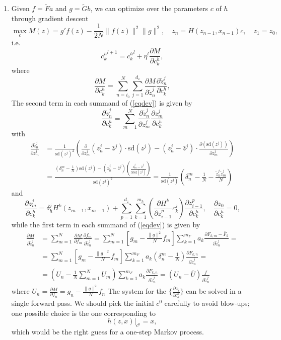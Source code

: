 \documentclass[a4paper,11pt]{article}
\theoremstyle{definition}
\begin{document}
\begin{enumerate}
\item Given $f=\tilde{F}a$ and $g=\tilde{G}b$, we can optimize over the parameters $c$ of $h$ through gradient descent
%
$$ \max_{c} M(z) =  g' f(z)  - \frac{1}{2 N} \|f(z)\|^2 \|g\|^2 , \quad  z_n = H\left(z_{n-1}, x_{n-1} \right) c, \quad  z_1 = z_0, $$
%
i.e.
%
$$ {c_{k}^h}^{l+1} = {c_{k}^h}^l + \eta^l \frac{\partial M}{\partial c_{k}^h}, $$
%
where
%
\begin{equation}\label{eqdev} \frac{\partial M}{\partial c_{k}^h} = \sum_{n=i_0}^N \sum_{j=1}^{d_z} \frac{\partial M}{\partial \tilde{z}^j_n} \frac{\partial \tilde{z}^j_n}{\partial c_{k}^h},
\end{equation}
%
The second term in each summand of (\ref{eqdev}) is given by
%
$$ \frac{\partial \tilde{z}^j_n}{\partial c_{k}^h}=\sum_{m=1}^{N}\frac{\partial \tilde{z}^j_n}{\partial z^j_m}\frac{\partial z^j_m}{\partial c_{k}^h} $$
%
with
\begin{align}\frac{\partial \tilde{z}_n^j}{\partial z_m^j} &= \frac{1}{\text{sd}(z^j)^2}\left(\frac{\partial}{\partial z_m^j}(z_n^j - \bar{z}^j) \cdot \text{sd}(z^j) - (z_n^j - \bar{z}^j) \cdot \frac{\partial (\text{sd}(z^j))}{\partial z_m^j}\right)\nonumber\\
&= \frac{\left( \delta_{n}^m - \frac{1}{N} \right)\text{sd}(z^j) - (z_n^j - \bar{z}^j)\left( \frac{z_m^j - \bar{z}^j}{N\text{sd}(z^j)} \right)}{\text{sd}(z^j)^2}= \frac{1}{\text{sd}(z^j)} \left( \delta_{n}^m - \frac{1}{N} - \frac{\tilde{z}^j_n \tilde{z}^j_m}{N} \right)  \nonumber
\end{align}
%
and
%
$$ \frac{\partial z^j_m}{\partial c_{k}^h} = \delta_h^j H^k\left(z_{m-1}, x_{m-1} \right) + \sum_{p=1}^{d_z} \sum_{k=1}^{m_h} \left(\frac{\partial H^k}{\partial z^p_{i-1}}  c^j_k \right) \frac{\partial z^p_{i-1}}{\partial c_{k}^h} ,
\quad \frac{\partial z_0}{\partial c_{k}^h} = 0, $$
while the first term in each summand of (\ref{eqdev}) is given by
%
\begin{align} \frac{\partial M}{\partial \tilde{z}^j_n} &= \sum_{m=1}^N\frac{\partial M}{\partial f_m}\frac{\partial f_m}{\partial \tilde{z}^j_n} =\sum_{m=1}^N\left[g_m - \frac{\|g\|^2}{N} f_m\right]\sum_{k=1}^{m_F}a_k \frac{\partial F_{k,m}-\bar{F}_k}{\partial \tilde{z}^j_n}=\nonumber\\
&=\sum_{m=1}^N\left[g_m - \frac{\|g\|^2}{N} f_m\right]\sum_{k=1}^{m_F}a_k \left(\delta_n^m-\frac{1}{N}\right) \frac{\partial F_{k,n}}{\partial \tilde{z}^j_n}=\nonumber\\
&=\left(U_n-\frac{1}{N}\sum_{m=1}^N U_m\right) \sum_{k=1}^{m_F}a_k  \frac{\partial F_{k,n}}{\partial \tilde{z}^j_n}=(U_n-\bar{U})\frac{f}{\partial \tilde{z}_n^j}
\end{align}
where $U_n=\frac{\partial M}{\partial f_n}=g_n - \frac{\|g\|^2}{N} f_n$
%
The system for the $\{\frac{\partial z_i}{\partial c_{k}^h}\}$ can be solved in a single forward pass. We should pick the initial $c^0$ carefully to avoid blow-ups; one possible choice is the one corresponding to
%
$$ h(z, x)\Big|_{c^0} =  x, $$
%
which would be the right guess for a one-step Markov process.



\end{enumerate}
\end{document}

